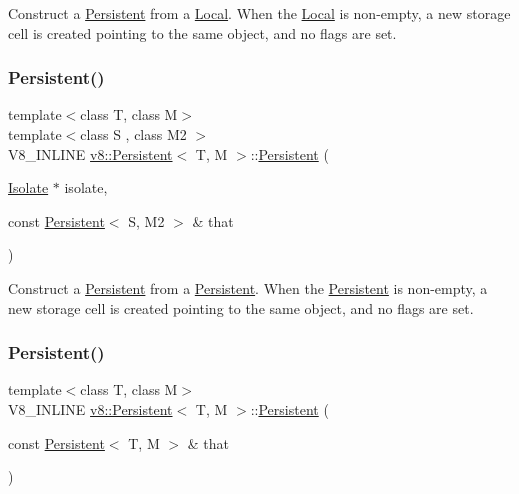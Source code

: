Construct a \mbox{\hyperlink{classv8_1_1Persistent}{Persistent}} from a \mbox{\hyperlink{classv8_1_1Local}{Local}}. When the \mbox{\hyperlink{classv8_1_1Local}{Local}} is non-\/empty, a new storage cell is created pointing to the same object, and no flags are set. \mbox{\label{classv8_1_1Persistent_aaf9eb7c4e6d0ef2c81a2c08238653578}} 
\subsubsection{\texorpdfstring{Persistent()}{Persistent()}\hspace{0.1cm}{\footnotesize\ttfamily [3/4]}}
{\footnotesize\ttfamily template$<$class T, class M$>$ \\
template$<$class S , class M2 $>$ \\
V8\+\_\+\+I\+N\+L\+I\+NE \mbox{\hyperlink{classv8_1_1Persistent}{v8\+::\+Persistent}}$<$ T, M $>$\+::\mbox{\hyperlink{classv8_1_1Persistent}{Persistent}} (\begin{DoxyParamCaption}\item[{\mbox{\hyperlink{classv8_1_1Isolate}{Isolate}} $\ast$}]{isolate,  }\item[{const \mbox{\hyperlink{classv8_1_1Persistent}{Persistent}}$<$ S, M2 $>$ \&}]{that }\end{DoxyParamCaption})\hspace{0.3cm}{\ttfamily [inline]}}

Construct a \mbox{\hyperlink{classv8_1_1Persistent}{Persistent}} from a \mbox{\hyperlink{classv8_1_1Persistent}{Persistent}}. When the \mbox{\hyperlink{classv8_1_1Persistent}{Persistent}} is non-\/empty, a new storage cell is created pointing to the same object, and no flags are set. \mbox{\label{classv8_1_1Persistent_a22331e91572784cd5ed5519739bb50c7}} 
\subsubsection{\texorpdfstring{Persistent()}{Persistent()}\hspace{0.1cm}{\footnotesize\ttfamily [4/4]}}
{\footnotesize\ttfamily template$<$class T, class M$>$ \\
V8\+\_\+\+I\+N\+L\+I\+NE \mbox{\hyperlink{classv8_1_1Persistent}{v8\+::\+Persistent}}$<$ T, M $>$\+::\mbox{\hyperlink{classv8_1_1Persistent}{Persistent}} (\begin{DoxyParamCaption}\item[{const \mbox{\hyperlink{classv8_1_1Persistent}{Persistent}}$<$ T, M $>$ \&}]{that }\end{DoxyParamCaption})\hspace{0.3cm}{\ttfamily [inline]}}

